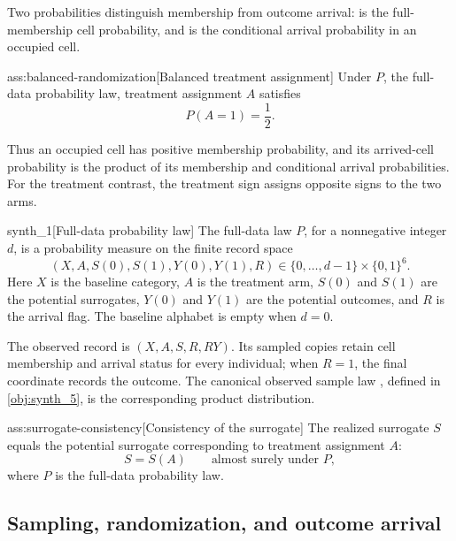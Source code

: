 Two probabilities distinguish membership from outcome arrival:  is the full-membership cell probability, and  is the conditional arrival probability in an occupied cell.

\begin{assumptionv}{ass:balanced-randomization}[Balanced treatment assignment]
Under \(P\), the full-data probability law, treatment assignment \(A\) satisfies
\[
P(A=1)=\frac12.
\]
\end{assumptionv}

Thus an occupied cell has positive membership probability, and its arrived-cell probability is the product of its membership and conditional arrival probabilities. For the treatment contrast, the treatment sign  assigns opposite signs to the two arms.

\begin{definitionv}{synth_1}[Full-data probability law]
The full-data law \(P\), for a nonnegative integer \(d\), is a probability measure on the finite record space
\[
(X,A,S(0),S(1),Y(0),Y(1),R)
\in \{0,\ldots,d-1\}\times\{0,1\}^{6}.
\]
Here \(X\) is the baseline category, \(A\) is the treatment arm, \(S(0)\) and \(S(1)\) are the potential surrogates, \(Y(0)\) and \(Y(1)\) are the potential outcomes, and \(R\) is the arrival flag. The baseline alphabet is empty when \(d=0\).
\end{definitionv}

The observed record  is \((X,A,S,R,RY)\). Its sampled copies  retain cell membership and arrival status for every individual; when \(R=1\), the final coordinate records the outcome. The canonical observed sample law , defined in \cref{obj:synth_5}, is the corresponding product distribution.

\begin{assumptionv}{ass:surrogate-consistency}[Consistency of the surrogate]
The realized surrogate \(S\) equals the potential surrogate corresponding to treatment assignment \(A\):
\[
S=S(A)\qquad\text{almost surely under }P,
\]
where \(P\) is the full-data probability law.
\end{assumptionv}

\subsection{Sampling, randomization, and outcome arrival}

